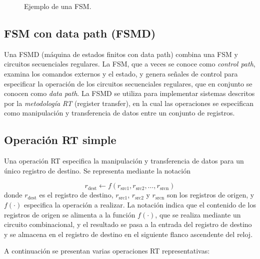     \begin{figure}[!h]
        \centering
        \caption{Ejemplo de una FSM.}
        \label{fig:fsm_asm_example}
    \end{figure}


    \subsection{FSM con data path (FSMD)}

    Una FSMD (máquina de estados finitos con data path) combina una FSM y circuitos secuenciales regulares. La FSM, que a veces se conoce como \textit{control path}, examina los comandos externos y el estado, y genera señales de control para especificar la operación de los circuitos secuenciales regulares, que en conjunto se conocen como \textit{data path}. La FSMD se utiliza para implementar sistemas descritos por la \textit{metodología RT} (register transfer), en la cual las operaciones se especifican como manipulación y transferencia de datos entre un conjunto de registros.

    \subsection{Operación RT simple}

    Una operación RT especifica la manipulación y transferencia de datos para un único registro de destino. Se representa mediante la notación

    \begin{equation}
      r_{\text{dest}} \leftarrow f( r_{\text{src1}}, r_{\text{src2}}, \ldots, r_{\text{srcn}})
    \end{equation}
    donde $r_{\text{dest}}$ es el registro de destino, $r_{\text{src1}}$, $r_{\text{src2}}$ y $r_{\text{srcn}}$ son los registros de origen, y $f(\cdot)$ especifica la operación a realizar. La notación indica que el contenido de los registros de origen se alimenta a la función $f(\cdot)$, que se realiza mediante un circuito combinacional, y el resultado se pasa a la entrada del registro de destino y se almacena en el registro de destino en el siguiente flanco ascendente del reloj. 

    A continuación se presentan varias operaciones RT representativas:

